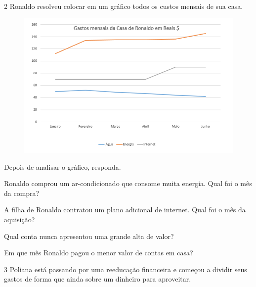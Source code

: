 \num{2} Ronaldo resolveu colocar em um gráfico todos os custos mensais de sua casa.

\begin{figure}[H]
\centering\includegraphics[width=\textwidth]{./imgSAEB_8_MAT/media/image40.png}
\end{figure}

Depois de analisar o gráfico, responda.

\begin{escolha}[itemsep=0pt]
\item Ronaldo comprou um ar-condicionado que consome muita energia. Qual foi o mês da compra?\\

\item A filha de Ronaldo contratou um plano adicional de internet. Qual foi o mês da aquisição?\\

\item Qual conta nunca apresentou uma grande alta de valor?\\

\item Em que mês Ronaldo pagou o menor valor de contas em casa?\\
\end{escolha}


\num{3} Poliana está passando por uma reeducação financeira e começou a
dividir seus gastos de forma que ainda sobre um dinheiro para
aproveitar.

